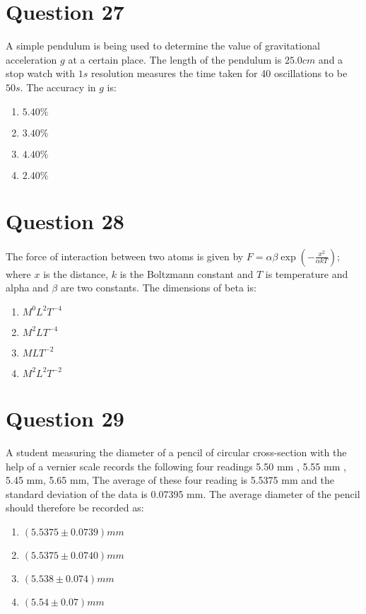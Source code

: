 \documentclass{article}
\begin{document}
\section*{Question 27}
A simple pendulum is being used to determine the value of gravitational acceleration \(g\) at a certain place. The length of the pendulum is \(25.0 cm\) and a stop watch with \(1 s\) resolution measures the time taken for 40 oscillations to be \(50 s\). The accuracy in \(g\) is: 
\begin{enumerate}[label=(\alph*)]
\item \(5.40 \%\)
\item \(3.40 \%\)
\item \(4.40 \%\)
\item \(2.40 \%\)
\end{enumerate}
\newpage
\section*{Question 28}
The force of interaction between two atoms is given by \(F=\alpha \beta \exp \left(-\frac{x^2}{\alpha k T}\right)\); where \(x\) is the distance, \(k\) is the Boltzmann constant and \(T\) is temperature and alpha and \(\beta\) are two constants. The dimensions of beta is: 
\begin{enumerate}[label=(\alph*)]
\item \(M^0 L^2 T^{-4}\)
\item \(M^2 L T^{-4}\)
\item \(M L T^{-2}\)
\item \(M^2 L^2 T^{-2}\)
\end{enumerate}
\newpage
\section*{Question 29}
A student measuring the diameter of a pencil of circular cross-section with the help of a vernier scale records the following four readings 5.50 mm , 5.55 mm , 5.45 mm, 5.65 mm, The average of these four reading is 5.5375 mm and the standard deviation of the data is 0.07395 mm. The average diameter of the pencil should therefore be recorded as: 
\begin{enumerate}[label=(\alph*)]
\item \( (5.5375 \pm 0.0739) mm \)
\item \( (5.5375 \pm 0.0740) mm \)
\item \( (5.538 \pm 0.074) mm \)
\item \( (5.54 \pm 0.07) mm\)
\end{enumerate}
\newpage
\end{document}
